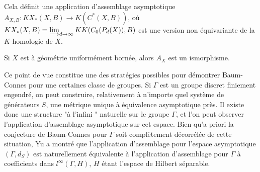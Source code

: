 Cela définit une application d'assemblage asymptotique $A_{X,B} : KX_*(X,B)\rightarrow K(C^*(X,B))$, où $KX_*(X,B)=\varinjlim_{d\rightarrow \infty} KK(C_0(P_d(X)),B)$ est une version non équivariante de la $K$-homologie de $X$.
\begin{conj} Si $X$ est à géométrie uniformément bornée, alors $A_X$ est un ismorphisme.
\end{conj}

Ce point de vue constitue une des stratégies possibles pour démontrer Baum-Connes pour une certaines classe de groupes. Si $\Gamma$ est un groupe discret finiement engendré, on peut construire, relativement à n'importe quel système de générateurs $S$, une métrique unique à équivalence asymptotique près. Il existe donc une structure "à l'infini " naturelle sur le groupe $\Gamma$, et l'on peut observer l'application d'assemblage asymptotique sur cet espace. Bien qu'a priori la conjecture de Baum-Connes pour $\Gamma$ soit complètement décorrélée de cette situation, Yu a montré que l'application d'assemblage pour l'espace asymptotique $(\Gamma, d_S)$ est naturellement équivalente à l'application d'assemblage pour $\Gamma$ à coefficients dans $l^\infty(\Gamma, H)$, $H$ étant l'espace de Hilbert séparable.















